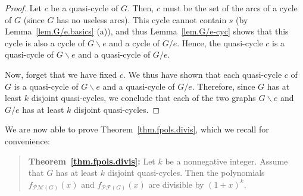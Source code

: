 \documentclass[12pt]{amsart}
\theoremstyle{definition}
\newenvironment{statement}{\begin{quote}}{\end{quote}}
\newcommand{\tup}[1]{\left( #1 \right)}
\newcommand{\Pm}[1]{\mathcal{PM}\left(#1\right)}
\newcommand{\Pf}[1]{\mathcal{PF}\left(#1\right)}
\begin{document}
\begin{proof}
Let $c$ be a quasi-cycle of $G$.
Then, $c$ must be the set of the arcs of a cycle of $G$ (since
$G$ has no useless arcs).
This cycle cannot contain $s$ (by Lemma~\ref{lem.G/e.basics} (a)),
and thus Lemma~\ref{lem.G/e-cyc} shows that this cycle
is also a cycle of $G \backslash e$ and a cycle of $G / e$.
Hence, the quasi-cycle $c$ is a quasi-cycle of $G \backslash e$
and a quasi-cycle of $G / e$.

Now, forget that we have fixed $c$.
We thus have shown that each quasi-cycle $c$ of $G$ is a quasi-cycle
of $G \backslash e$ and a quasi-cycle of $G / e$.
Therefore, since $G$ has at least $k$ disjoint quasi-cycles,
we conclude that each of the two graphs $G \backslash e$ and $G / e$
has at least $k$ disjoint quasi-cycles.
\end{proof}

We are now able to prove Theorem~\ref{thm.fpols.divis}, which we recall for convenience:

\begin{statement} \textbf{Theorem~\ref{thm.fpols.divis}:}
Let $k$ be a nonnegative integer.
Assume that $G$ has at least $k$ disjoint quasi-cycles.
Then the polynomials $f_{\Pm{G}}\tup{x}$ and $f_{\Pf{G}}\tup{x}$ are divisible by $\tup{1+x}^k$.
\end{statement}
\end{document}
